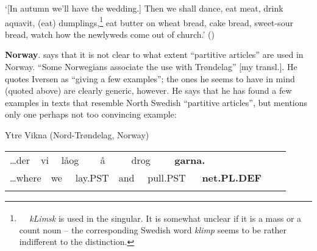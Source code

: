 \begin{styleTranslation}
‘[In autumn we’ll have the wedding.] Then we shall dance, eat meat, drink aquavit, (eat) dumplings,\footnote{\textsuperscript{\ \ } \textit{kLimsk} is used in the singular. It is somewhat unclear if it is a mass or a count noun – the corresponding Swedish word \textit{klimp} seems to be rather indifferent to the distinction.  } eat butter on wheat bread, cake bread, sweet-sour bread, watch how the newlyweds come out of church.’ (\citet[76]{Vendell1882})

\end{styleTranslation}

\begin{styleBodytextC}
\textbf{Norway}. \citet[16]{Delsing2003a} says that it is not clear to what extent “partitive articles” are used in Norway. “Some Norwegians associate the use with Trøndelag” [my transl.]. He quotes Iversen as “giving a few examples”; the ones he seems to have in mind (quoted above) are clearly generic, however. He says that he has found a few examples in texts that resemble North Swedish “partitive articles”, but mentions only one perhaps not too convincing example: 

\end{styleBodytextC}

\begin{listWWNumileveli}
\item {}

\begin{styleExample}
Ytre Vikna (Nord-Trøndelag, Norway)

\end{styleExample}

\end{listWWNumileveli}

\begin{tabular}{llllllllllllll}
\lsptoprule
…der & \multicolumn{2}{l}{vi

} & \multicolumn{2}{l}{låog

} & \multicolumn{2}{l}{å

} & \multicolumn{2}{l}{drog

} & \multicolumn{2}{l}{{\bfseries garna.}

} & \multicolumn{2}{l}{} & \\
\multicolumn{2}{l}{…where

} & \multicolumn{2}{l}{we

} & \multicolumn{2}{l}{lay.PST 

} & \multicolumn{2}{l}{and

} & \multicolumn{2}{l}{pull.PST

} & \multicolumn{2}{l}{{\bfseries net.PL.DEF}

} & \multicolumn{2}{l}{}\\
\lspbottomrule
\end{tabular}

